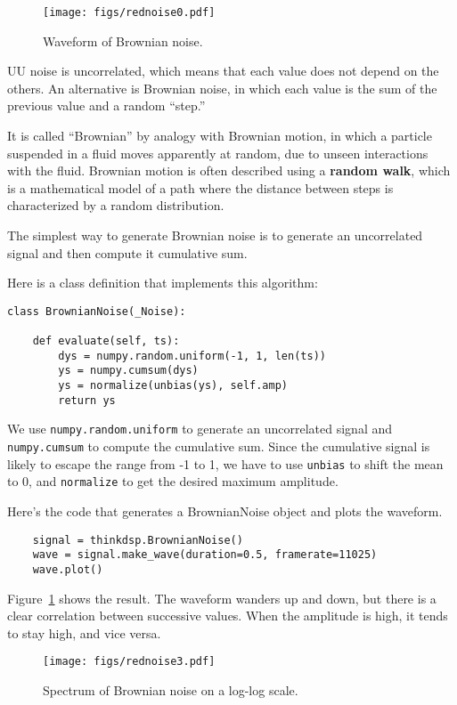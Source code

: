 \documentclass[12pt]{book}
\begin{document}
\begin{figure}
\centerline{\texttt{[image: figs/rednoise0.pdf]}}
\caption{Waveform of Brownian noise.}
\label{fig.rednoise0}
\end{figure}

UU noise is uncorrelated, which means that each value does not depend
on the others.  An alternative is Brownian noise, in which each value
is the sum of the previous value and a random ``step.''

It is called ``Brownian'' by analogy with Brownian motion, in which a
particle suspended in a fluid moves apparently at random, due to
unseen interactions with the fluid.  Brownian motion is often
described using a {\bf random walk}, which is a mathematical model 
of a path where the distance between steps is characterized by a
random distribution.

The simplest way to generate Brownian noise is to generate an
uncorrelated signal and then compute it cumulative sum.

Here is a class definition that implements this algorithm:

\begin{verbatim}
class BrownianNoise(_Noise):

    def evaluate(self, ts):
        dys = numpy.random.uniform(-1, 1, len(ts))
        ys = numpy.cumsum(dys)
        ys = normalize(unbias(ys), self.amp)
        return ys
\end{verbatim}

We use {\tt numpy.random.uniform} to generate an uncorrelated signal
and {\tt numpy.cumsum} to compute the cumulative sum.  Since the
cumulative signal is likely to escape the range from -1 to 1, we
have to use {\tt unbias} to shift the mean to 0, and
{\tt normalize} to get the desired maximum amplitude.

Here's the code that generates a BrownianNoise object and plots the
waveform.

\begin{verbatim}
    signal = thinkdsp.BrownianNoise()
    wave = signal.make_wave(duration=0.5, framerate=11025)
    wave.plot()
\end{verbatim}

Figure~\ref{fig.rednoise0} shows the result.  The waveform
wanders up and down, but there is a clear correlation between
successive values.  When the amplitude is high, it tends to stay
high, and vice versa.

\begin{figure}
\centerline{\texttt{[image: figs/rednoise3.pdf]}}
\caption{Spectrum of Brownian noise on a log-log scale.}
\label{fig.rednoise3}
\end{figure}
\end{document}
